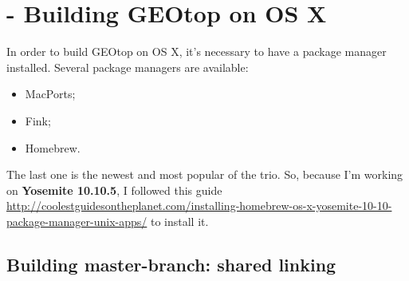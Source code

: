 \section{ - Building GEOtop on OS X}\label{sec:20150824}

In order to build GEOtop on OS X, it's necessary to have a package manager installed. Several package managers are available:

\begin{itemize}
\item MacPorts;
\item Fink;
\item Homebrew.
\end{itemize}
The last one is the newest and most popular of the trio. So, because I'm working on \textbf{Yosemite 10.10.5}, I followed this guide \url{http://coolestguidesontheplanet.com/installing-homebrew-os-x-yosemite-10-10-package-manager-unix-apps/} to install it.

\subsection{Building master-branch: shared linking}

